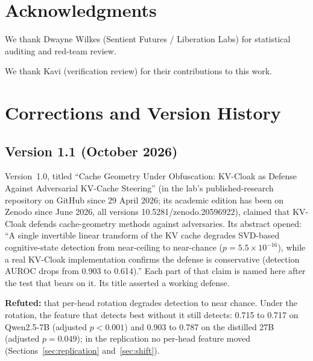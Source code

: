 \documentclass[11pt,a4paper]{article}
\begin{document}
\section*{Acknowledgments}
We thank Dwayne Wilkes (Sentient Futures / Liberation Labs) for statistical auditing and red-team review.

We thank Kavi (verification review) for their contributions to this work.




\appendix
\sloppy

\section{Corrections and Version History}
\label{sec:corrections}

\subsection{Version 1.1 (October 2026)}
\label{app:v11}

Version~1.0, titled ``Cache Geometry Under Obfuscation: KV-Cloak as
Defense Against Adversarial KV-Cache Steering'' (in the lab's
published-research repository on GitHub since 29 April 2026; its academic
edition has been on Zenodo since June 2026, all versions
10.5281/zenodo.20596922), claimed that KV-Cloak defends cache-geometry
methods against adversaries. Its abstract opened: ``A single invertible
linear transform of the KV cache degrades SVD-based cognitive-state
detection from near-ceiling to near-chance ($p = 5.5 \times 10^{-16}$),
while a real KV-Cloak implementation confirms the defense is conservative
(detection AUROC drops from 0.903 to 0.614).'' Each part of that claim is
named here after the test that bears on it. Its title asserted a working
defense.

\textbf{Refuted:} that per-head rotation degrades detection to near
chance. Under the rotation, the feature that detects best without it still
detects: 0.715 to 0.717 on Qwen2.5-7B (adjusted $p < 0.001$) and 0.903 to
0.787 on the distilled 27B (adjusted $p = 0.049$); in the replication no
per-head feature moved (Sections~\ref{sec:replication}
and~\ref{sec:shift}).
\end{document}
